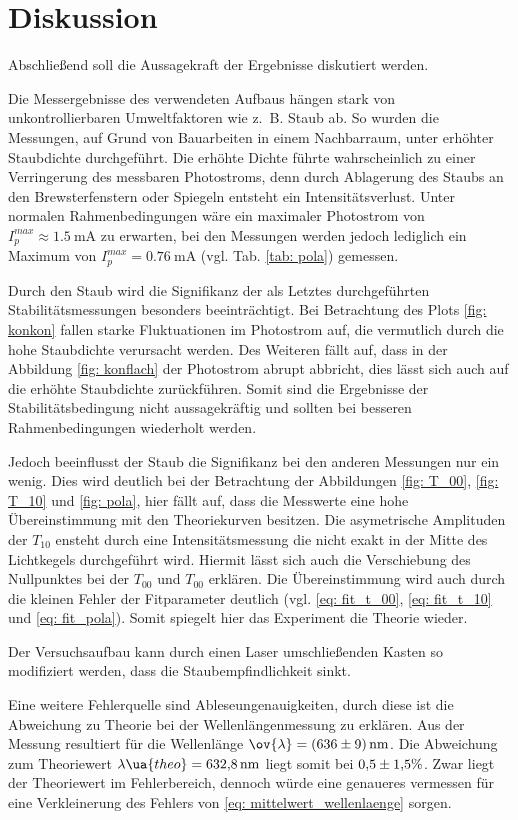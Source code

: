 \section{Diskussion}
Abschließend soll die Aussagekraft der Ergebnisse diskutiert werden.

Die Messergebnisse des verwendeten Aufbaus hängen stark von
unkontrollierbaren Umweltfaktoren wie z.\, B. Staub ab. %
So wurden die Messungen, auf Grund von Bauarbeiten in einem Nachbarraum, %
unter erhöhter Staubdichte durchgeführt. Die erhöhte Dichte führte wahrscheinlich zu einer Verringerung des
messbaren Photostroms, denn durch Ablagerung des Staubs an den Brewsterfenstern oder Spiegeln entsteht ein
Intensitätsverlust. Unter normalen Rahmenbedingungen wäre ein
maximaler Photostrom von $I_{p}^{max}\approx\SI{1.5}{\milli\ampere}$ zu erwarten,
bei den Messungen werden jedoch lediglich ein Maximum von $I_{p}^{max}=\SI{0.76}{\milli\ampere}$ %
(vgl. Tab. \ref{tab: pola}) gemessen.

Durch den Staub wird die Signifikanz der als Letztes durchgeführten Stabilitätsmessungen besonders beeinträchtigt.
Bei Betrachtung des Plots \ref{fig: konkon} fallen starke Fluktuationen im Photostrom auf,
die vermutlich durch die hohe Staubdichte verursacht werden. Des Weiteren fällt auf, dass
in der Abbildung \ref{fig: konflach} der Photostrom abrupt abbricht, dies lässt sich
auch auf die erhöhte Staubdichte zurückführen. Somit sind die Ergebnisse der Stabilitätsbedingung nicht aussagekräftig und sollten
bei besseren Rahmenbedingungen wiederholt werden.

Jedoch beeinflusst der Staub die Signifikanz bei den anderen Messungen nur ein wenig.
Dies wird deutlich bei der Betrachtung der Abbildungen \ref{fig: T_00}, \ref{fig: T_10} und \ref{fig: pola},
hier fällt auf, dass die Messwerte eine hohe Übereinstimmung mit den Theoriekurven besitzen.
Die asymetrische Amplituden der $T_{10}$ ensteht durch eine Intensitätsmessung
die nicht exakt in der Mitte des Lichtkegels durchgeführt wird.
Hiermit lässt sich auch die Verschiebung des Nullpunktes bei der $T_{00}$ und $T_ {00}$ erklären.
Die Übereinstimmung wird auch durch die kleinen Fehler der Fitparameter deutlich
(vgl. \eqref{eq: fit_t_00}, \eqref{eq: fit_t_10} und \eqref{eq: fit_pola}).
Somit spiegelt hier das Experiment die Theorie wieder.

Der Versuchsaufbau kann durch einen Laser umschließenden Kasten so modifiziert werden,
dass die Staubempfindlichkeit sinkt.

Eine weitere Fehlerquelle sind Ableseungenauigkeiten,
durch diese ist die Abweichung zu Theorie bei der Wellenlängenmessung zu erklären.
Aus der Messung resultiert für die Wellenlänge $\ov{\lambda}=\SI{636\pm9}{\nano\meter}$.
Die Abweichung zum Theoriewert $\lambda\ua{theo}=\SI{632.8}{\nano\meter}$ \cite{anleitung61}
liegt somit bei $\num{0.5\pm 1.5} \%$. Zwar liegt der Theoriewert im Fehlerbereich, dennoch
würde eine genaueres vermessen für eine Verkleinerung des Fehlers von \eqref{eq: mittelwert_wellenlaenge} sorgen.

